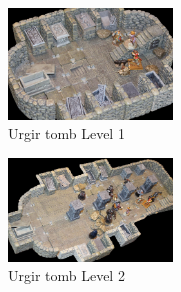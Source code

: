 \begin{figure}[h]
	\centering
	\includegraphics[width=0.39\textwidth]{images/Urgir-tomb-Level-1-594710874.jpg}
	\caption{Urgir tomb Level 1}
	\label{fig:Urgir-tomb-Level-1-594710874}
\end{figure}

\begin{figure}[h]
	\centering
	\includegraphics[width=0.39\textwidth]{images/Urgir-tomb-Level-2-594712324.jpg}
	\caption{Urgir tomb Level 2}
	\label{fig:Urgir-tomb-Level-2-594712324}
\end{figure}

